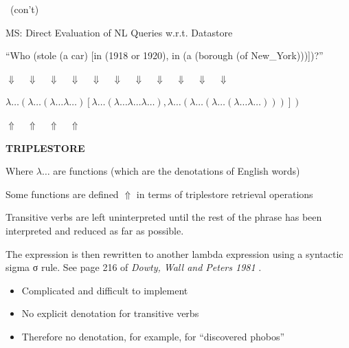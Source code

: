 \documentclass[logoontitle,tabu,supertabular,aspectratio=43]{preney-uwindsor-beamer}
\begin{document}
    \begin{frame}{\insertsubsection\ (con't)}
        \centering

        MS: Direct Evaluation of NL Queries w.r.t. Datastore

        {
            \color{orange}
            ``Who (stole (a car) [in (1918 or 1920), in (a (borough (of New\_York)))])?''
        }

        $\Downarrow\quad\Downarrow\quad\Downarrow\quad\Downarrow\quad\Downarrow\quad\Downarrow\quad\Downarrow\quad\Downarrow\quad\Downarrow\quad\Downarrow\quad\Downarrow$

        {\small$\lambda\ldots ( \lambda\ldots ( \lambda\ldots \lambda\ldots) [\lambda\ldots (\lambda\ldots \lambda\ldots \lambda\ldots), \lambda \ldots(\lambda\ldots(\lambda\ldots ( \lambda\ldots \lambda\ldots)))])$}

        $\Uparrow\quad\Uparrow\quad\Uparrow\quad\Uparrow$

        \textbf{TRIPLESTORE}

        Where $\lambda\ldots$ are functions (which are the denotations of English words)

        {
            \color{red}
            Some functions are defined
        }
        $\Uparrow$
        {
            \color{red}
            in terms of triplestore retrieval operations
        }
    \end{frame}

    \begin{frame}{\insertsubsection}
        Transitive verbs are left uninterpreted until the rest of the phrase has been interpreted and
        reduced as far as possible.

        The expression is then rewritten to another lambda expression using a syntactic
        sigma σ rule. See page 216 of \textit{Dowty, Wall and Peters 1981}\cite{Dowty:wall} .

        \begin{itemize}
            \item Complicated and difficult to implement

            \item No explicit denotation for transitive verbs

            \item Therefore no denotation, for example, for ``discovered phobos''
        \end{itemize}
    \end{frame}

\end{document}
